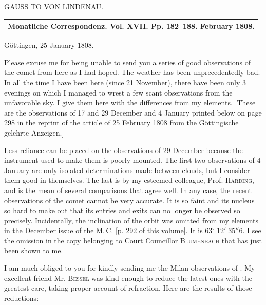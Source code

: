 \clearpage
{}
\hypertarget{native-301-lower}{}
\begin{center}GAUSS TO VON LINDENAU.
\end{center}

\begin{center}
\begin{tabular}{c}
\hline
Monatliche Correspondenz. Vol. XVII. Pp. 182--188. February 1808.\\
\hline
\end{tabular}
\end{center}

\begin{flushright}
Göttingen, 25 January 1808.
\end{flushright}

Please excuse me for being unable to send you a series of good observations of the comet from here as I had hoped. The weather has been unprecedentedly bad. In all the time I have been here (since 21 November), there have been only 3 evenings on which I managed to wrest a few scant observations from the unfavorable sky. I give them here with the differences from my elements. [These are the observations of 17 and 29 December and 4 January printed below on page 298 in the reprint of the article of 25 February 1808 from the Göttingische gelehrte Anzeigen.]

\par\indent Less reliance can be placed on the observations of 29 December because the instrument used to make them is poorly mounted. The first two observations of 4 January are only isolated determinations made between clouds, but I consider them good in themselves. The last is by my esteemed colleague, Prof. \textsc{Harding}, and is the mean of several comparisons that agree well. In any case, the recent observations of the comet cannot be very accurate. It is so faint and its nucleus so hard to make out that its entries and exits can no longer be observed so precisely. Incidentally, the inclination of the orbit was omitted from my elements in the December issue of the M.\,C. [p. 292 of this volume]. It is $63^\circ\;12'\;35''6$. I see the omission in the copy belonging to Court Councillor \textsc{Blumenbach} that has just been shown to me.

\par\indent I am much obliged to you for kindly sending me the Milan observations of \VestaAltarThreeOhOne{}. My excellent friend Mr. \textsc{Bessel} was kind enough to reduce the latest ones with the greatest care, taking proper account of refraction. Here are the results of those reductions:


